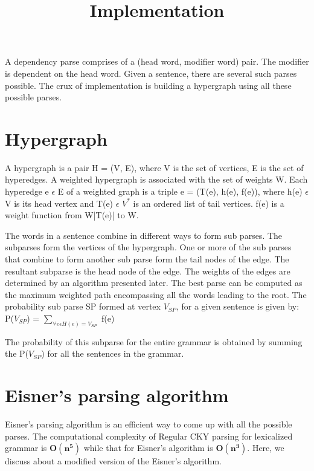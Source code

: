 \documentclass{article}
\title{Implementation}
\begin{document}
\maketitle{}

\date{}

A dependency parse comprises of a (head word, modifier word) pair. The modifier is dependent on the head word. Given a sentence, there are several such parses possible.  The crux of implementation is building a hypergraph using all these possible parses.

\section{Hypergraph}

A hypergraph is a pair H = (V, E), where V is the set of vertices, E is the set of hyperedges. A weighted hypergraph is associated with the set of weights W. Each hyperedge e $\epsilon$ E of a weighted graph is a triple e = (T(e), h(e), f(e)), where h(e) $\epsilon$ V is its head vertex and T(e) $\epsilon$ $V^*$ is an ordered list of tail vertices. f(e) is a weight function from W|T(e)| to W.

The words in a sentence combine in different ways to form sub parses. The subparses form the vertices of the hypergraph. One or more of the sub parses that combine to form another sub parse form the tail nodes of the edge. The resultant subparse is the head node of the edge. The weights of the edges are determined by an algorithm presented later. The best parse can be computed as the maximum weighted path encompassing all the words leading to the root. 
  The probability sub parse SP formed at vertex $V_{SP}$, for a given sentence is given by:
            P($V_{SP}$) = $\sum_{\forall e \epsilon H(e) = V_{SP}}$ f(e)

The probability of this subparse for the entire grammar is obtained by summing the P($V_{SP}$) for all the sentences in the grammar.

\section{Eisner's parsing algorithm}

Eisner's parsing algorithm is an efficient way to come up with all the possible parses. The computational complexity of Regular CKY parsing for lexicalized grammar is $\bm{O(n^5)}$ while that for Eisner's algorithm is $\bm{O(n^3)}$. Here, we discuss about a modified version of the Eisner's algorithm.
\end{document}
